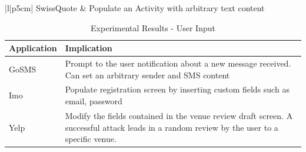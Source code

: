 \begin{table}[t]
{\begin{tabular}{|l|p{5cm}|}
    SwissQuote & Populate an Activity with arbitrary text content \\
    \hline
  \end{tabular}
  }
  \parbox{.45\linewidth}{
  \centering
  \caption{Experimental Results - User Input}
  \label{table:2}

  \begin{tabular}{|l|p{5cm}|}%
    \hline
    Application & Implication \\ \hline
    GoSMS & Prompt to the user notification about a new message received. Can set an arbitrary sender and SMS content \\
    Imo & Populate registration screen by inserting custom fields such as email, password \\
    Yelp & Modify the fields contained in the venue review draft screen. A successful attack leads in a random review by the user to a specific venue. \\
    \hline
  \end{tabular}
  }
\end{table}

